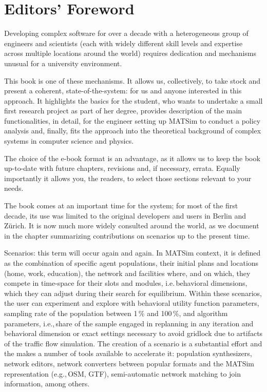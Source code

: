\chapter*{Editors' Foreword}

Developing complex software for over a decade with a heterogeneous group of engineers and scientists (each with widely different skill levels and expertise across multiple locations around the world) requires dedication and mechanisms unusual for a university environment. 

This book is one of these mechanisms. It allows us, collectively, to take stock and present a coherent, state-of-the-system: for us and anyone interested in this approach. It highlights the basics for the student, who wants to undertake a small first research project as part of her degree, provides description of the main functionalities, in detail, for the engineer setting up MATSim to conduct a policy analysis and, finally, fits the approach into the theoretical background of complex systems in computer science and physics. 

The choice of the e-book format is an advantage, as it allows us to keep the book up-to-date with future chapters, revisions and, if necessary, errata. Equally importantly it allows you, the readers, to select those sections relevant to your needs. 

The book comes at an important time for the system; for most of the first decade, its use was limited to the original developers and users in Berlin and Zürich. It is now much more widely consulted around the world, as we document in the chapter summarizing contributions on scenarios up to the present time. 

Scenarios: this term will occur again and again. In MATSim context, it is defined as the combination of specific agent populations, their initial plans and locations (home, work, education), the network and facilities where, and on which, they compete in time-space for their slots and modules, i.e.\,behavioral dimensions, which they can adjust during their search for equilibrium. Within these scenarios, the user can experiment and explore with behavioral utility function parameters, sampling rate of the population between 1\,\% and 100\,\%, and algorithm parameters, i.e.,\,share of the sample engaged in replanning in any iteration and behavioral dimension or exact settings necessary to avoid gridlock due to artifacts of the traffic flow simulation. The creation of a scenario is a substantial effort and the  makes a number of tools available to accelerate it: population synthesizers, network editors, network converters between popular formats and the MATSim representation (e.g.,\,OSM, GTF), semi-automatic network matching to join information, among others.

